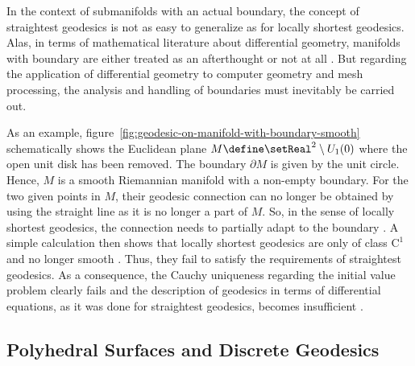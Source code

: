 \documentclass{stdlocal}
\begin{document}
  In the context of submanifolds with an actual boundary, the concept of straightest geodesics is not as easy to generalize as for locally shortest geodesics.
  Alas, in terms of mathematical literature about differential geometry, manifolds with boundary are either treated as an afterthought or not at all \autocite{goldhorn2009,carmo2016,kuehnel2013}.
  But regarding the application of differential geometry to computer geometry and mesh processing, the analysis and handling of boundaries must inevitably be carried out.

  As an example, figure~\ref{fig:geodesic-on-manifold-with-boundary-smooth} schematically shows the Euclidean plane $M\define \setReal^2\setminus U_1(0)$ where the open unit disk has been removed.
  The boundary $\partial M$ is given by the unit circle.
  Hence, $M$ is a smooth Riemannian manifold with a non-empty boundary.
  For the two given points in $M$, their geodesic connection can no longer be obtained by using the straight line as it is no longer a part of $M$.
  So, in the sense of locally shortest geodesics, the connection needs to partially adapt to the boundary \autocite{albrecht1991}.
  A simple calculation then shows that locally shortest geodesics are only of class $\mathrm{C}^1$ and no longer smooth \autocite{alexander1981}.
  Thus, they fail to satisfy the requirements of straightest geodesics.
  As a consequence, the Cauchy uniqueness regarding the initial value problem clearly fails and the description of geodesics in terms of differential equations, as it was done for straightest geodesics, becomes insufficient \autocite{alexander1986,alexander1987}.





\subsection{Polyhedral Surfaces and Discrete Geodesics} %
\label{sub:polyhedral_surfaces}
\end{document}

